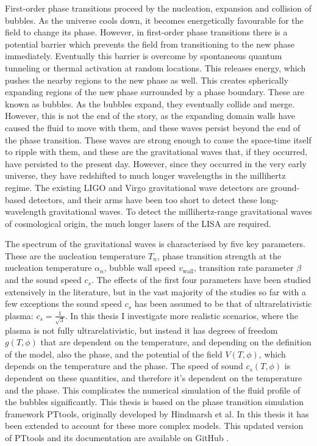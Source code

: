 First-order phase transitions proceed by the nucleation, expansion and collision of bubbles.
As the universe cools down,
it becomes energetically favourable for the field to change its phase.
However, in first-order phase transitions there is a potential barrier which prevents the field from transitioning to the new phase immediately.
Eventually this barrier is overcome by spontaneous quantum tunneling or thermal activation at random locations.
This releases energy, which pushes the nearby regions to the new phase as well.
This creates spherically expanding regions of the new phase surrounded by a phase boundary.
These are known as bubbles.
As the bubbles expand, they eventually collide and merge.
However, this is not the end of the story,
as the expanding domain walls have caused the fluid to move with them,
and these waves persist beyond the end of the phase transition.
These waves are strong enough to cause the space-time itself to ripple with them,
and these are the gravitational waves that, if they occurred, have persisted to the present day.
However, since they occurred in the very early universe, they have redshifted to much longer wavelengths in the millihertz regime.
The existing LIGO and Virgo gravitational wave detectors are ground-based detectors,
and their arms have been too short to detect these long-wavelength gravitational waves.
To detect the millihertz-range gravitational waves of cosmological origin, the much longer lasers of the LISA are required.
\cites{lecture_notes}{hindmarsh_gw_pt_2019}{mazumdar_review_2019}

The spectrum of the gravitational waves is characterised by five key parameters.
These are the nucleation temperature $T_n$,
phase transition strength at the nucleation temperature $\alpha_n$,
bubble wall speed $v_{\text{wall}}$,
transition rate parameter $\beta$
and the sound speed $c_s$.
\cite{lecture_notes}
The effects of the first four parameters have been studied extensively in the literature,
but in the vast majority of the studies so far with a few exceptions
\cites{leitao_hydrodynamics_2015}{giese_2020}{giese_2021}{tenkanen_speed_2022}{tian_gw_2024}
the sound speed $c_s$ has been assumed to be that of ultrarelativistic plasma: $c_s = \frac{1}{\sqrt{3}}$.
In this thesis I investigate more realistic scenarios, where the plasma is not fully ultrarelativistic,
but instead it has degrees of freedom $g(T,\phi)$ that are dependent on the temperature,
and depending on the definition of the model, also the phase,
and the potential of the field $V(T,\phi)$,
which depends on the temperature and the phase.
The speed of sound $c_s(T,\phi)$ is dependent on these quantities,
and therefore it's dependent on the temperature and the phase.
This complicates the numerical simulation of the fluid profile of the bubbles significantly.
\cites{leitao_hydrodynamics_2015}{giese_2020}{giese_2021}
This thesis is based on the phase transition simulation framework PTtools,
originally developed by Hindmarsh et al.
In this thesis it has been extended to account for these more complex models.
This updated version of PTtools and its documentation are available on GitHub \cite{pttools}.

